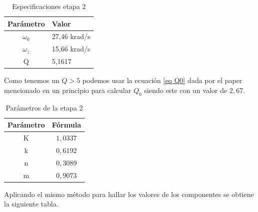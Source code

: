 \begin{table}[h!]
\begin{tabular}{|c|l|}
\hline
\textbf{Parámetro} & \textbf{Valor} \\ \hline
$\omega_0$         & 27,46 krad/s   \\ \hline
$\omega_z$         & 15,66 krad/s   \\ \hline
Q                  & 5,1617         \\ \hline
\end{tabular}
\centering
\caption{Especificaciones etapa 2}
\label{etapa2table}
\end{table}


Como tenemos un $Q > 5$ podemos usar la ecuación \ref{eq Q0} dada por el paper mencionado en un principio para calcular $Q_0$ siendo este con un valor de $2,67$.

\begin{table}[h!]
\begin{tabular}{|c|c|}
\hline
\textbf{Parámetro} & \textbf{Fórmula} \\ \hline
K                  & $1,0337$             \\ \hline
k                  & $0,6192$             \\ \hline
n                  & $0,3089$             \\ \hline
m                  & $0,9073$             \\ \hline
\end{tabular}
\centering
\caption{Parámetros de la etapa 2}
\end{table}



Aplicando el mismo método para hallar los valores de los componentes se obtiene la siguiente tabla.


